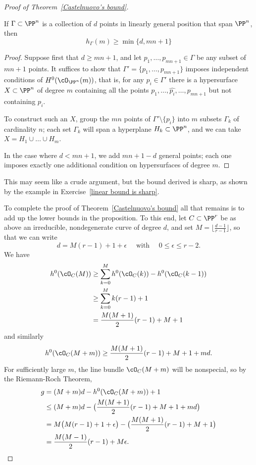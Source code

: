\begin{proof}[Proof of Theorem~\ref{Castelnuovo's bound}]
\begin{proposition}\label{min hilb}
If $\Gamma \subset \PP^n$ is a collection of $d$ points in linearly general position that span $\PP^n$, then 
$$
h_\Gamma(m) \geq \min\{d, mn+1\}
$$
\end{proposition}

\begin{proof}
Suppose first that $d \geq mn+1$, and let $p_1,\dots,p_{mn+1} \in \Gamma$ be any subset of $mn+1$ points. It suffices to show that $\Gamma' = \{p_1,\dots,p_{mn+1}\}$ imposes independent conditions of $H^0(\cO_{\PP^n}(m))$, that is, for any $p_i \in \Gamma'$ there is a hypersurface $X \subset \PP^n$ of degree $m$ containing all the points $p_1,\dots, \hat{p_i},\dots,p_{mn+1}$ but not containing $p_i$.

To construct such an $X$, group the $mn$ points of $\Gamma' \setminus \{p_i\}$ into $m$ subsets $\Gamma_k$ of cardinality $n$; each set $\Gamma_k$ will span a hyperplane $H_k \subset \PP^n$, and we can take $X = H_1 \cup \dots \cup H_m$. 

In the case where $d<mn+1$, we add $mn+1-d$ general points; each one imposes exactly one
additional condition on hypersurfaces of degree $m$.
\end{proof}
This may seem like a crude argument, but the bound derived is sharp, as shown by the example in Exercise~\ref{linear bound is sharp}.

To complete the proof of Theorem~\ref{Castelnuovo's bound} all that remains is to add up the lower bounds in the proposition. To this end, let $C \subset \PP^r$ be as above an irreducible, nondegenerate curve of degree $d$, and set $M = \lfloor{\frac{d-1}{r-1}}\rfloor$, so that we can write
$$
d = M(r-1) + 1 + \epsilon \quad \text{ with } \quad 0 \leq \epsilon \leq r-2.
$$
We have 
\begin{align*}
h^0(\cO_C(M)) &\geq \sum_{k=0}^M h^0(\cO_C(k)) - h^0(\cO_C(k-1)) \\
&\geq  \sum_{k=0}^M k(r-1)+1 \\
&= \frac{M(M+1)}{2}(r-1) + M + 1
\end{align*}
and similarly
$$
h^0(\cO_C(M+m)) \geq \frac{M(M+1)}{2}(r-1) + M + 1 + md.
$$
For sufficiently large $m$, the line bundle $\cO_C(M+m)$ will be nonspecial, so by the Riemann-Roch Theorem,
\begin{align*}
g &= (M+m)d - h^0(\cO_C(M+m)) + 1 \\
&\leq (M+m)d - \bigl(  \frac{M(M+1)}{2}(r-1) + M + 1 + md \bigr) \\
& = M\bigl( M(r-1) + 1 + \epsilon \bigr) - \bigl(  \frac{M(M+1)}{2}(r-1) + M + 1 \bigr) \\
&= \frac{M(M-1)}{2}(r-1) + M\epsilon.
\end{align*}
 \end{proof}

